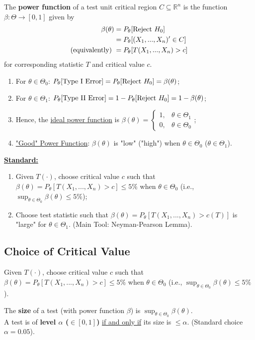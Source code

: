 \documentclass[11pt]{elegantbook}
\begin{document}
\begin{definition}
    \normalfont
    The \textbf{power function} of a test unit critical region $C\subseteq \mathbb{R}^n$ is the function $\beta:\Theta \rightarrow [0,1]$ given by
    \begin{equation}
        \begin{aligned}
            \beta(\theta)&=P_\theta[\textnormal{Reject $H_0$}]\\
            &=P_\theta[(X_1,...,X_n)'\in C]\\
            \textnormal{(equivalently) }&=P_\theta[T(X_1,...,X_n)>c]
        \end{aligned}
        \nonumber
    \end{equation}
    for corresponding statistic $T$ and critical value $c$.
\end{definition}
\begin{enumerate}[$\circ$]
    \item For $\theta\in\Theta_0$: $P_\theta[\textnormal{Type I Error}]=P_\theta[\textnormal{Reject $H_0$}]=\beta(\theta)$;
    \item For $\theta\in\Theta_1$: $P_\theta[\textnormal{Type II Error}]=1-P_\theta[\textnormal{Reject $H_0$}]=1-\beta(\theta)$;
    \item Hence, the \underline{ideal power function} is $\beta(\theta)=\left\{\begin{matrix}
        1,&\theta\in\Theta_1\\
        0,&\theta\in\Theta_0
    \end{matrix}\right.$;
    \item \underline{"Good" Power Function}: $\beta(\theta)$ is "low" ("high") when $\theta\in\Theta_0$ ($\theta\in\Theta_1$).
\end{enumerate}
\textbf{\underline{Standard:}}
\begin{enumerate}[(1).]
    \item Given $T(\cdot)$, choose critical value $c$ such that $\beta(\theta)=P_\theta[T(X_1,...,X_n)>c]\leq 5\%$ when $\theta\in\Theta_0$ (i.e., $\sup_{\theta\in\Theta_0}\beta(\theta)\leq 5\%$);
    \item Choose test statistic such that $\beta(\theta)=P_\theta[T(X_1,...,X_n)>c(T)]$ is "large" for $\theta\in\Theta_1$. (Main Tool: Neyman-Pearson Lemma).
\end{enumerate}


\subsection{Choice of Critical Value}
Given $T(\cdot)$, choose critical value $c$ such that $\beta(\theta)=P_\theta[T(X_1,...,X_n)>c]\leq 5\%$ when $\theta\in\Theta_0$ (i.e., $\sup_{\theta\in\Theta_0}\beta(\theta)\leq 5\%$).
\begin{definition}
    \normalfont
    The \textbf{size} of a test (with power function $\beta$) is $\sup_{\theta\in\Theta_0}\beta(\theta)$.\\
    A test is of \textbf{level $\alpha$ ($\in[0,1]$)} \underline{if and only if} its size is $\leq \alpha$. (Standard choice $\alpha=0.05$).
\end{definition}
\end{document}

